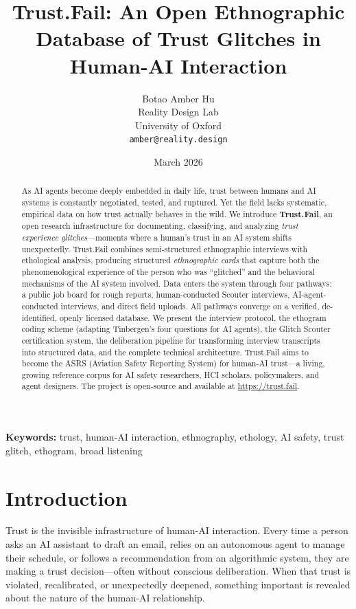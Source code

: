 \documentclass[11pt,a4paper]{article}
\title{\textbf{Trust.Fail: An Open Ethnographic Database of Trust Glitches in Human-AI Interaction}}
\author{
    Botao Amber Hu\\
    Reality Design Lab\\
    University of Oxford\\
    \texttt{amber@reality.design}
}
\date{March 2026}
\begin{document}
\maketitle

\begin{abstract}
As AI agents become deeply embedded in daily life, trust between humans and AI systems is constantly negotiated, tested, and ruptured. Yet the field lacks systematic, empirical data on how trust actually behaves in the wild. We introduce \textbf{Trust.Fail}, an open research infrastructure for documenting, classifying, and analyzing \textit{trust experience glitches}---moments where a human's trust in an AI system shifts unexpectedly. Trust.Fail combines semi-structured ethnographic interviews with ethological analysis, producing structured \textit{ethnographic cards} that capture both the phenomenological experience of the person who was ``glitched'' and the behavioral mechanisms of the AI system involved. Data enters the system through four pathways: a public job board for rough reports, human-conducted Scouter interviews, AI-agent-conducted interviews, and direct field uploads. All pathways converge on a verified, de-identified, openly licensed database. We present the interview protocol, the ethogram coding scheme (adapting Tinbergen's four questions for AI agents), the Glitch Scouter certification system, the deliberation pipeline for transforming interview transcripts into structured data, and the complete technical architecture. Trust.Fail aims to become the ASRS (Aviation Safety Reporting System) for human-AI trust---a living, growing reference corpus for AI safety researchers, HCI scholars, policymakers, and agent designers. The project is open-source and available at \url{https://trust.fail}.
\end{abstract}

\textbf{Keywords:} trust, human-AI interaction, ethnography, ethology, AI safety, trust glitch, ethogram, broad listening

\section{Introduction}

Trust is the invisible infrastructure of human-AI interaction. Every time a person asks an AI assistant to draft an email, relies on an autonomous agent to manage their schedule, or follows a recommendation from an algorithmic system, they are making a trust decision---often without conscious deliberation. When that trust is violated, recalibrated, or unexpectedly deepened, something important is revealed about the nature of the human-AI relationship.
\end{document}
